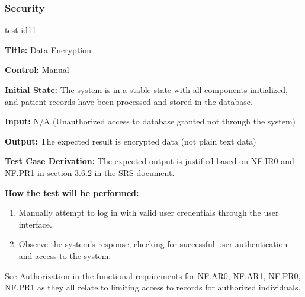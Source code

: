 \documentclass[12pt, titlepage]{article}
\begin{document}
\subsubsection{Security}
\begin{itemize}
    \begin{item}
        test-id11
        \begin{mdframed}[linewidth=0.5mm]
            \textbf{Title:} Data Encryption \par
            \textbf{Control:} Manual \par
            \textbf{Initial State:} The system is in a stable state with all components initialized, and patient records have been processed and stored in the database. \par
            \textbf{Input:} N/A (Unauthorized access to database granted not through the system) \par
            \textbf{Output:} The expected result is encrypted data (not plain text data) \par
            \textbf{Test Case Derivation:} The expected output is justified based on NF.IR0 and NF.PR1 in section 3.6.2 in the SRS document. \par
            \textbf{How the test will be performed:}
            \begin{enumerate} [noitemsep]
                \item Manually attempt to log in with valid user credentials through the user interface.
                \item Observe the system's response, checking for successful user authentication and access to the system.
            \end{enumerate}
        \end{mdframed}
    \end{item}
\end{itemize}
See \hyperlink{Auth}{Authorization} in the functional requirements for NF.AR0, NF.AR1, NF.PR0, NF.PR1 as they all relate to limiting access to records for authorized individuals.
\end{document}
